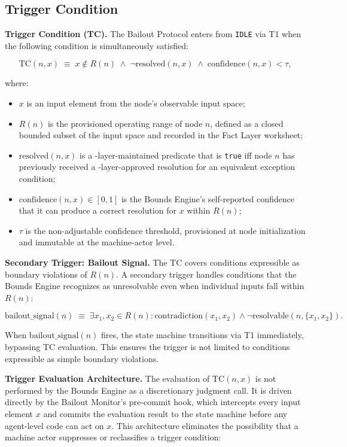 \subsection{Trigger Condition}\label{sec:trigger}

\textbf{Trigger Condition (TC).} The Bailout Protocol enters from \texttt{IDLE} via T1 when the following condition is simultaneously satisfied:

\[
\text{TC}(n, x) \;\equiv\; x \notin R(n) \;\land\; \neg\text{resolved}(n, x) \;\land\; \text{confidence}(n, x) < \tau,
\tag{TC}
\]

where:
\begin{itemize}\itemsep=0pt
\item $x$ is an input element from the node's observable input space;
\item $R(n)$ is the provisioned operating range of node $n$, defined as a closed bounded subset of the input space and recorded in the Fact Layer worksheet;
\item $\text{resolved}(n, x)$ is a \fact-layer-maintained predicate that is \texttt{true} iff node $n$ has previously received a \fact-layer-approved resolution for an equivalent exception condition;
\item $\text{confidence}(n, x) \in [0, 1]$ is the Bounds Engine's self-reported confidence that it can produce a correct resolution for $x$ within $R(n)$;
\item $\tau$ is the non-adjustable confidence threshold, provisioned at node initialization and immutable at the machine-actor level.
\end{itemize}

\medskip
\noindent\textbf{Secondary Trigger: Bailout Signal.} The TC covers conditions expressible as boundary violations of $R(n)$. A secondary trigger handles conditions that the Bounds Engine recognizes as unresolvable even when individual inputs fall within $R(n)$:

\[
\text{bailout\_signal}(n) \;\equiv\; \exists x_1, x_2 \in R(n) : \text{contradiction}(x_1, x_2) \land \neg\text{resolvable}(n, \{x_1, x_2\}).
\tag{TS}
\]

When $\text{bailout\_signal}(n)$ fires, the state machine transitions via T1 immediately, bypassing TC evaluation. This ensures the trigger is not limited to conditions expressible as simple boundary violations.

\medskip
\noindent\textbf{Trigger Evaluation Architecture.} The evaluation of $\text{TC}(n, x)$ is not performed by the Bounds Engine as a discretionary judgment call. It is driven directly by the Bailout Monitor's pre-commit hook, which intercepts every input element $x$ and commits the evaluation result to the state machine before any agent-level code can act on $x$. This architecture eliminates the possibility that a machine actor suppresses or reclassifies a trigger condition:

